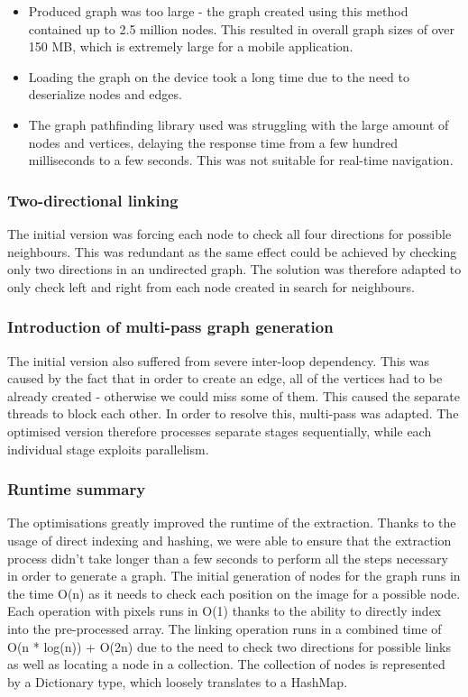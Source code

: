\documentclass[main.tex]{subfiles}
\begin{document}
\begin{itemize}

\item Produced graph was too large - the graph created using this method contained up to 2.5 million nodes. This resulted in overall graph sizes of over 150 MB, which is extremely large for a mobile application.

\item Loading the graph on the device took a long time due to the need to deserialize nodes and edges.

\item The graph pathfinding library used was struggling with the large amount of nodes and vertices, delaying the response time from a few hundred milliseconds to a few seconds. This was not suitable for real-time navigation.

\end{itemize}
	

\subsubsection{Two-directional linking}
	
The initial version was forcing each node to check all four directions for possible neighbours. This was redundant as the same effect could be achieved by checking only two directions in an undirected graph. The solution was therefore adapted to only check left and right from each node created in search for neighbours.

\subsubsection{Introduction of multi-pass graph generation}
The initial version also suffered from severe inter-loop dependency. This was caused by the fact that in order to create an edge, all of the vertices had to be already created - otherwise we could miss some of them. This caused the separate threads to block each other. In order to resolve this, multi-pass was adapted.  The optimised version therefore processes separate stages sequentially, while each individual stage exploits parallelism.

\subsubsection{Runtime summary}
The optimisations greatly improved the runtime of the extraction. Thanks to the usage of direct indexing and hashing, we were able to ensure that the extraction process didn't take longer than a few seconds to perform all the steps necessary in order to generate a graph. The initial generation of nodes for the graph runs in the time O(n) as it needs to check each position on the image for a possible node. Each operation with pixels runs in O(1) thanks to the ability to directly index into the pre-processed array. The linking operation runs in a combined time of O(n * log(n)) + O(2n) due to the need to check two directions for possible links as well as locating a node in a collection. The collection of nodes is represented by a Dictionary type, which loosely translates to a HashMap. 
\end{document}
